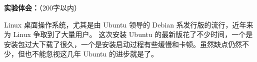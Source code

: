 \documentclass[cs4size,a4paper,nofonts]{ctexart}
\begin{document}
{\bf 实验体会：}（200字以内）

Linux 桌面操作系统，尤其是由 Ubuntu 领导的 Debian 系发行版的流行，近年来为 Linux 争取到了大量用户。
这次安装 Ubuntu 的最新版花了不少时间，一个是安装包过大下载了很久，一个是安装启动过程有些缓慢和卡顿。虽然缺点仍然不少，但也不能忽视这几年 Ubuntu 的进步就是了。
\end{document}
